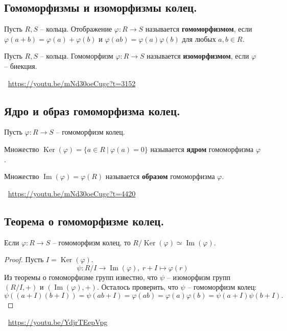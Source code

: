 \subsection{Гомоморфизмы и изоморфизмы колец.}
\begin{definition}
    Пусть $R, S$ -- кольца. Отображение $\varphi : R \to S$ называется \textbf{гомоморфизмом}, если $\varphi(a + b) = \varphi(a) + \varphi(b)$ и $\varphi(ab) = \varphi(a)\varphi(b)$ для любых $a, b \in R$.
\end{definition}
\begin{definition}
    Пусть $R, S$ -- кольца. Гомоморфизм $\varphi : R \to S$ называется \textbf{изоморфизмом}, если $\varphi$ -- биекция.
\end{definition}
\large \faYoutube \normalsize $\>$ \url{https://youtu.be/mNd30oeCugc?t=3152}

\subsection{Ядро и образ гомоморфизма колец.}
Пусть $\varphi : R \to S$ -- гомоморфизм колец.
\begin{definition}
    Множество $\operatorname{Ker}(\varphi) = \{ a \in R \> | \> \varphi(a) = 0 \}$ называется \textbf{ядром} гомоморфизма $\varphi$.
\end{definition}
\begin{definition}
    Множество $\operatorname{Im}(\varphi) = \varphi(R)$ называется \textbf{образом} гомоморфизма $\varphi$.
\end{definition}
\large \faYoutube \normalsize $\>$ \url{https://youtu.be/mNd30oeCugc?t=4420}

\subsection{Теорема о гомоморфизме колец.}
\begin{theorem}
    Если $\varphi : R \to S$ -- гомоморфизм колец, то $R / \operatorname{Ker}(\varphi) \simeq \operatorname{Im}(\varphi)$.
    \begin{proof}
        Пусть $I = \operatorname{Ker}(\varphi)$.
        \[
            \psi : R / I \to \operatorname{Im}(\varphi), \> r + I \mapsto \varphi(r)
        \]
        Из теоремы о гомоморфизме групп известно, что $\psi$ -- изоморфизм групп $(R / I, +)$ и $(\operatorname{Im}(\varphi), +)$. Осталось проверить, что $\psi$ -- гомоморфизм колец:
        \[
            \psi((a + I)(b + I)) = \psi(ab + I) = \varphi(ab) = \varphi(a)\varphi(b) = \psi(a + I)\psi(b + I). 
        \]
    \end{proof}
\end{theorem}
\large \faYoutube \normalsize $\>$ \url{https://youtu.be/YdjrTEepVpg}